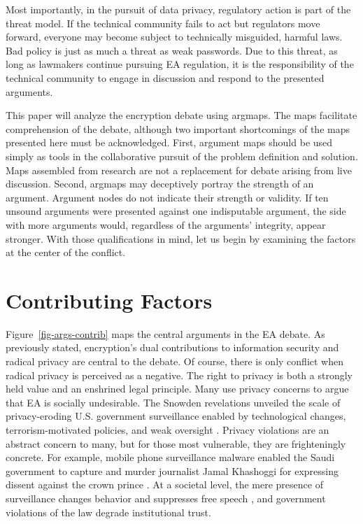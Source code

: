 \documentclass{IEEEtran}
\newcommand{\myfig}[1]{Figure~\ref{#1}}
\begin{document}
Most importantly, in the pursuit of data privacy, regulatory action is part of the threat model. If the technical
community fails to act but regulators move forward, everyone may become subject to technically misguided, harmful laws.
Bad policy is just as much a threat as weak passwords. Due to this threat, as long as lawmakers continue pursuing
\ac{EA} regulation, it is the responsibility of the technical community to engage in discussion and respond to the
presented arguments.

This paper will analyze the \ac{encryption} debate using \acp{argmap}. The maps facilitate comprehension of the
debate, although two important shortcomings of the maps presented here must be acknowledged. First, argument maps should be used simply
as tools in the collaborative pursuit of the problem definition and solution. Maps assembled from research are not a
replacement for debate arising from live discussion. Second, \acp{argmap} may deceptively portray the strength of an
argument. Argument nodes do not indicate their strength or validity. If ten unsound arguments were presented against one
indisputable argument, the side with more arguments would, regardless of the arguments' integrity, appear stronger. With
those qualifications in mind, let us begin by examining the factors at the center of the conflict.


\section{Contributing Factors}
\label{sed-arg-contrib}

\myfig{fig-args-contrib} maps the central arguments in the EA debate. As previously stated, \ac{encryption}'s dual
contributions to information security and radical privacy are central to the debate. Of course, there is only conflict
when radical privacy is perceived as a negative. The right to privacy is both a strongly held value and an enshrined
legal principle. Many use privacy concerns to argue that \ac{EA} is socially undesirable. The Snowden revelations
\cite{landau_making_2013} unveiled the scale of privacy-eroding U.S. government surveillance enabled by technological
changes, terrorism-motivated policies, and weak oversight \cite{shamsi_2011}. Privacy violations are an abstract concern
to many, but for those most vulnerable, they are frighteningly concrete. For example, mobile phone surveillance malware
enabled the Saudi government to capture and murder journalist Jamal Khashoggi for expressing dissent against the crown
prince \cite{liebermann_2019}. At a societal level, the mere presence of surveillance changes behavior and suppresses
free speech \cite{rogaway_moral_2015}, and government violations of the law degrade institutional trust.
\end{document}
